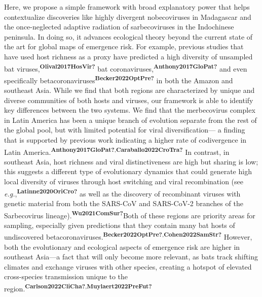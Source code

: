 \documentclass[10pt,oneside]{article}
\begin{document}
Here, we propose a simple framework with broad explanatory power that
helps contextualize discoveries like highly divergent nobecoviruses in
Madagascar and the once-neglected adaptive radiation of sarbecoviruses
in the Indochinese peninsula. In doing so, it advances ecological theory
beyond the current state of the art for global maps of emergence risk.
For example, previous studies that have used host richness as a proxy
have predicted a high diversity of unsampled bat
viruses,\textsuperscript{\textbf{Olival2017HosVir?}} bat
coronaviruses,\textsuperscript{\textbf{Anthony2017GloPat?}} and even
specifically
betacoronaviruses\textsuperscript{\textbf{Becker2022OptPre?}} in both
the Amazon and southeast Asia. While we find that both regions are
characterized by unique and diverse communities of both hosts and
viruses, our framework is able to identify key differences between the
two systems. We find that the merbecovirus complex in Latin America has
been a unique branch of evolution separate from the rest of the global
pool, but with limited potential for viral diversification--- a finding
that is supported by previous work indicating a higher rate of
codivergence in Latin
America.\textsuperscript{\textbf{Anthony2017GloPat?},\textbf{Caraballo2022CroTra?}}
In contrast, in southeast Asia, host richness and viral distinctiveness
are high but sharing is low; this suggests a different type of
evolutionary dynamics that could generate high local diversity of
viruses through host switching and viral recombination (see
\emph{e.g.},\textsuperscript{\textbf{Latinne2020OriCro?}} as well as the
discovery of recombinant viruses with genetic material from both the
SARS-CoV and SARS-CoV-2 branches of the Sarbecovirus
lineage).\textsuperscript{\textbf{Wu2021ComSur?}}Both of these regions
are priority areas for sampling, especially given predictions that they
contain many bat hosts of undiscovered
betacoronaviruses.\textsuperscript{\textbf{Becker2022OptPre?},\textbf{Cohen2022SamStr?}}
However, both the evolutionary and ecological aspects of emergence risk
are higher in southeast Asia---a fact that will only become more
relevant, as bats track shifting climates and exchange viruses with
other species, creating a hotspot of elevated cross-species transmission
unique to the
region.\textsuperscript{\textbf{Carlson2022CliCha?},\textbf{Muylaert2022PreFut?}}
\end{document}
